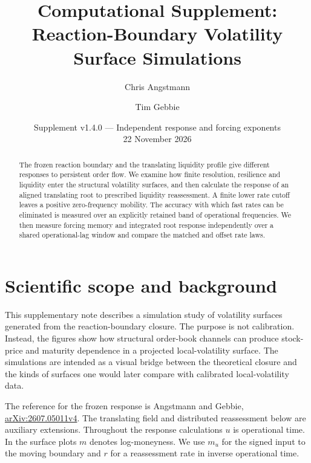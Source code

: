 \documentclass[11pt]{article}
\title{Computational Supplement:\\Reaction-Boundary Volatility Surface Simulations}
\author{Chris Angstmann \and Tim Gebbie}
\date{Supplement v1.4.0 --- Independent response and forcing exponents\\22 November 2026}
\begin{document}
\maketitle

\begin{abstract}
The frozen reaction boundary and the translating liquidity profile give different
responses to persistent order flow. We examine how finite resolution,
resilience and liquidity enter the structural volatility surfaces, and then
calculate the response of an aligned translating root to prescribed liquidity
reassessment. A finite lower rate cutoff leaves a positive zero-frequency
mobility. The accuracy with which fast rates can be eliminated is measured
over an explicitly retained band of operational frequencies. We then measure forcing memory and integrated root response independently over a shared operational-lag window and compare the matched and offset rate laws.
\end{abstract}
\tableofcontents

\section{Scientific scope and background}

This supplementary note describes a simulation study of volatility surfaces
generated from the reaction-boundary closure. The purpose is not calibration.
Instead, the figures show how structural order-book channels can produce
stock-price and maturity dependence in a projected local-volatility surface.
The simulations are intended as a visual bridge between the theoretical
closure and the kinds of surfaces one would later compare with calibrated
local-volatility data.

The reference for the frozen response is Angstmann and Gebbie,
\href{https://arxiv.org/abs/2607.05011v4}{arXiv:2607.05011v4}.
The translating field and distributed reassessment below are auxiliary
extensions. Throughout the response calculations \(u\) is operational
time. In the surface plots \(m\) denotes log-moneyness. We use \(m_u\)
for the signed input to the moving boundary and \(r\) for a reassessment
rate in inverse operational time.
\end{document}
